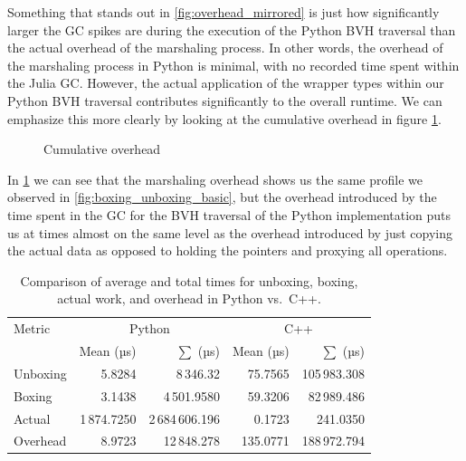 Something that stands out in \ref{fig:overhead_mirrored} is just how significantly larger the GC spikes are during the execution of the Python BVH traversal than the actual overhead of the marshaling process. In other words, the overhead of the marshaling process in Python is minimal, with no recorded time spent within the Julia GC. However, the actual application of the wrapper types within our Python BVH traversal contributes significantly to the overall runtime. We can emphasize this more clearly by looking at the cumulative overhead in figure \ref{fig:cumulative_overhead}.  

\begin{figure}[ht!]
  \centering
  
  \caption{Cumulative overhead}
  \label{fig:cumulative_overhead}
  \Description{}
\end{figure}

In \ref{fig:cumulative_overhead} we can see that the marshaling overhead shows us the same profile we observed in \ref{fig:boxing_unboxing_basic}, but the overhead introduced by the time spent in the GC for the BVH traversal of the Python implementation puts us at times almost on the same level as the overhead introduced by just copying the actual data as opposed to holding the pointers and proxying all operations. 

\begin{table}[ht!]
  \centering
  \begin{tabular}{lrrrr}
    \toprule
 Metric   & \multicolumn{2}{c}{Python}       & \multicolumn{2}{c}{C++}          \\
             & Mean (µs) & $\sum$ (µs)      & Mean (µs) & $\sum$ (µs)      \\
    \midrule
 Unboxing & 5.8284       & 8\,346.32       & 75.7565      & 105\,983.308    \\
 Boxing   & 3.1438       & 4\,501.9580     & 59.3206      & 82\,989.486     \\
 Actual   & 1\,874.7250  & 2\,684\,606.196 & 0.1723       & 241.0350        \\
 Overhead & 8.9723       & 12\,848.278     & 135.0771     & 188\,972.794    \\
    \bottomrule
  \end{tabular}
  \caption{Comparison of average and total times for unboxing, boxing, actual work, and overhead in Python vs.\ C++.}
  \label{tab:perf-metrics}
\end{table}

